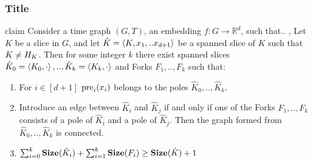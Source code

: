 \documentclass{beamer}
\begin{document}
\begin{frame}
  \frametitle{Title} 

  \begin{block}{claim}
    \label{claim:prevslices}
    Consider a time graph $(G,T)$, an embedding $f : G \rightarrow \mathbb{R}^{d}$, such that.. , Let $K$ be a slice in $G$, and let $\hat{K} = \braket{K, x_{1}, .. x_{d+1}}$ be a spanned slice of $K$ such that $K \neq H_{K}$. Then for some integer $k$ there exist spanned slices $\hat{K}_{0} = \braket{K_{0}, \cdot}, ..,\hat{K}_{k}=\braket{K_{k}, \cdot }$ and Forks $F_{1},..,F_{k}$ such that:
    \begin{enumerate}
      \item For $i \in [d+1]$ $ \text{pre}_{i}(x_{i}) $ belongs to the poles $\hat{K}_{0},..,\hat{K}_{k}$.  
      \item Introduce an edge between $\hat{K}_{i}$ and $\hat{K}_{j}$ if and only if one of the Forks $F_{1},..,F_{k}$ consists of a pole of $\hat{K}_{i}$ and a pole of $\hat{K}_{j}$. Then the graph formed from $\hat{K}_{0},..,\hat{K}_{k}$ is connected.  
      \item $\sum_{i=0}^{k}\mathbf{Size}(\hat{K}_{i}) +  \sum^{k}_{i=1}\mathbf{Size}(F_{i}) \ge \mathbf{Size}(\hat{K}) + 1 $
    \end{enumerate}
  \end{block}
\end{frame}
 
\end{document}
